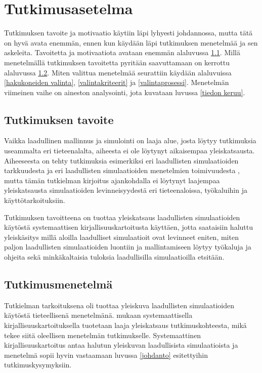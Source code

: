 \documentclass[utf8]{gradu3}
\begin{document}
\chapter{Tutkimusasetelma}
Tutkimuksen tavoite ja motivaatio käytiin läpi lyhyesti johdannossa, mutta 
tätä on hyvä avata enemmän, ennen kun käydään läpi tutkimuksen menetelmää ja 
sen askeleita. Tavoitetta ja motivaatiota avataan enemmän alaluvussa \ref{tavoite}.
Millä menetelmällä tutkimuksen tavoitetta pyritään saavuttamaan on kerrottu alaluvussa 
\ref{tutkimusmenetelmä}. 
Miten valittua menetelmää seurattiin käydään alaluvuissa 
\ref{hakukoneiden valinta}, \ref{valintakriteerit} ja \ref{valintaprosessi}.
Menetelmän viimeinen vaihe on aineston analysointi, jota kuvataan luvussa
\ref{tiedon keruu}.

 \section{Tutkimuksen tavoite} \label{tavoite}
Vaikka laadullinen mallinnus ja simulointi on laaja alue, 
josta löytyy tutkimuksia useammalta eri tieteenalalta, 
aiheesta ei ole löytynyt aikaisempaa yleiskatsausta. 
Aiheeseesta on tehty tutkimuksia esimerkiksi 
eri laadullisten simulaatioiden tarkkuudesta \parencite{FisherManagmentTechniques2024} 
ja eri laadullisten simulaatioiden menetelmien toimivuudesta
\parencite{qualitativeSimTechniquesAssesment1992}, 
mutta tämän tutkielman kirjoitus ajankohdalla ei löytynyt laajempaa yleiskatsausta 
simulaatioiden levinneisyydestä eri tieteenaloissa, työkaluihin ja käyttötarkoituksiin.  

Tutkimuksen tavoitteena on tuottaa yleiskatsaus laadullisten simulaatioiden käytöstä
systemaattisen kirjallisuuskartoitusta käyttäen, jotta saataisiin haluttu yleiskäsitys millä aloilla laadulliset simulaatioit ovat levinneet eniten, miten paljon laadullisten simulaatioiden luontiin ja mallintamiseen löytyy työkaluja ja ohjeita sekä minkäkaltaisia tuloksia laadullisilla simulaatioilla etsitään.

\section{Tutkimusmenetelmä} \label{tutkimusmenetelmä}
Tutkielman tarkoituksena oli tuottaa yleiskuva laadullisten simulaatioiden käytöstä
tieteellisenä menetelmänä.
\textcite{keele2007guidelines} mukaan systemaattisella kirjallisuuskartoituksella 
tuotetaan laaja yleiskatsaus tutkimuskohteesta,
mikä tekee siitä oleellisen menetelmän tutkimukselle. 
Systemaattinen kirjallisuuskartoitus antaa halutun yleiskuvan laadullisista simulaatioista ja menetelmä sopii hyvin vastaamaan luvussa \ref{johdanto} esitettyihin tutkimuskysymyksiin.
\end{document}
